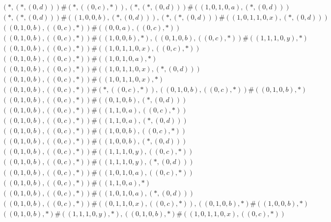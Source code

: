 \begin{align*}
	 & \qquad (*, (*, (0, d))) \# (*, ((0, c), *)), (*, (*, (0, d))) \# ((1, 0, 1, 0, a), (*, (0, d))) \\ 
	 & \qquad (*, (*, (0, d))) \# ((1, 0, 0, b), (*, (0, d))), (*, (*, (0, d))) \# ((1, 0, 1, 1, 0, x), (*, (0, d))) \\ 
	 & \qquad ((0, 1, 0, b), ((0, c), *)) \# ((0, 0, a), ((0, c), *)) \\ 
	 & \qquad ((0, 1, 0, b), ((0, c), *)) \# ((1, 0, 0, b), *), ((0, 1, 0, b), ((0, c), *)) \# ((1, 1, 1, 0, y), *) \\ 
	 & \qquad ((0, 1, 0, b), ((0, c), *)) \# ((1, 0, 1, 1, 0, x), ((0, c), *)) \\ 
	 & \qquad ((0, 1, 0, b), ((0, c), *)) \# ((1, 0, 1, 0, a), *) \\ 
	 & \qquad ((0, 1, 0, b), ((0, c), *)) \# ((1, 0, 1, 1, 0, x), (*, (0, d))) \\ 
	 & \qquad ((0, 1, 0, b), ((0, c), *)) \# ((1, 0, 1, 1, 0, x), *) \\ 
	 & \qquad ((0, 1, 0, b), ((0, c), *)) \# (*, ((0, c), *)), ((0, 1, 0, b), ((0, c), *)) \# ((0, 1, 0, b), *) \\ 
	 & \qquad ((0, 1, 0, b), ((0, c), *)) \# ((0, 1, 0, b), (*, (0, d))) \\ 
	 & \qquad ((0, 1, 0, b), ((0, c), *)) \# ((1, 1, 0, a), ((0, c), *)) \\ 
	 & \qquad ((0, 1, 0, b), ((0, c), *)) \# ((1, 1, 0, a), (*, (0, d))) \\ 
	 & \qquad ((0, 1, 0, b), ((0, c), *)) \# ((1, 0, 0, b), ((0, c), *)) \\ 
	 & \qquad ((0, 1, 0, b), ((0, c), *)) \# ((1, 0, 0, b), (*, (0, d))) \\ 
	 & \qquad ((0, 1, 0, b), ((0, c), *)) \# ((1, 1, 1, 0, y), ((0, c), *)) \\ 
	 & \qquad ((0, 1, 0, b), ((0, c), *)) \# ((1, 1, 1, 0, y), (*, (0, d))) \\ 
	 & \qquad ((0, 1, 0, b), ((0, c), *)) \# ((1, 0, 1, 0, a), ((0, c), *)) \\ 
	 & \qquad ((0, 1, 0, b), ((0, c), *)) \# ((1, 1, 0, a), *) \\ 
	 & \qquad ((0, 1, 0, b), ((0, c), *)) \# ((1, 0, 1, 0, a), (*, (0, d))) \\ 
	 & \qquad ((0, 1, 0, b), ((0, c), *)) \# ((0, 1, 1, 0, x), ((0, c), *)), ((0, 1, 0, b), *) \# ((1, 0, 0, b), *) \\ 
	 & \qquad ((0, 1, 0, b), *) \# ((1, 1, 1, 0, y), *), ((0, 1, 0, b), *) \# ((1, 0, 1, 1, 0, x), ((0, c), *)) \\ 

\end{align*}
